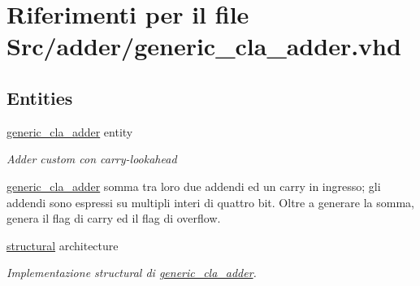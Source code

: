 \hypertarget{generic__cla__adder_8vhd}{\section{Riferimenti per il file Src/adder/generic\+\_\+cla\+\_\+adder.vhd}
\label{generic__cla__adder_8vhd}
}
\subsection*{Entities}
\begin{DoxyCompactItemize}
\item 
\hyperlink{classgeneric__cla__adder}{generic\+\_\+cla\+\_\+adder} entity
\begin{DoxyCompactList}\small\item\em Adder custom con carry-\/lookahead

\hyperlink{classgeneric__cla__adder}{generic\+\_\+cla\+\_\+adder} somma tra loro due addendi ed un carry in ingresso; gli addendi sono espressi su multipli interi di quattro bit. Oltre a generare la somma, genera il flag di carry ed il flag di overflow. \end{DoxyCompactList}\item 
\hyperlink{classgeneric__cla__adder_1_1structural}{structural} architecture
\begin{DoxyCompactList}\small\item\em Implementazione structural di \hyperlink{classgeneric__cla__adder}{generic\+\_\+cla\+\_\+adder}. \end{DoxyCompactList}\end{DoxyCompactItemize}


